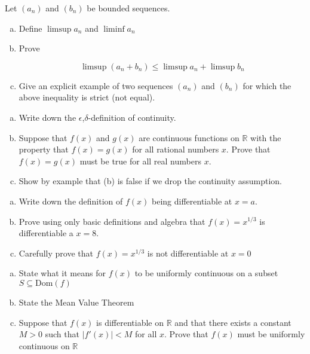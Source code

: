 \documentclass[11pt]{exam}
\theoremstyle{definition}
\begin{document}
\begin{questions}
\newpage
\question[10]\mbox{}
Let $(a_n)$ and $(b_n)$ be bounded sequences.
\begin{enumerate}[(a)]
\item Define $\limsup a_n$ and $\liminf a_n$
\vspace{2in}
\item Prove

$$\limsup (a_n+b_n)\leq \limsup a_n + \limsup b_n$$
\vspace{3in}

\item

Give an explicit example of two sequences $(a_n)$ and $(b_n)$ for which the above inequality is strict (not equal).
\end{enumerate}


\newpage
\question[10]\mbox{}

\begin{enumerate}[(a)]
\item Write down the $\epsilon$,$\delta$-definition of continuity.
\vspace{2in}
\item Suppose that $f(x)$ and $g(x)$ are continuous functions on $\mathbb{R}$ with the property that $f(x) = g(x)$ for all rational numbers $x$.  Prove that $f(x)=g(x)$ must be true for all real numbers $x$.
\vspace{3in}
\item Show by example that (b) is false if we drop the continuity assumption.
\end{enumerate}


\newpage
\question[10]\mbox{}

\begin{enumerate}[(a)]
\item Write down the definition of $f(x)$ being differentiable at $x=a$.
\vspace{1.3in}
\item Prove using only basic definitions and algebra that $f(x) = x^{1/3}$ is differentiable a $x=8$.
\vspace{4in}
\item Carefully prove that $f(x) = x^{1/3}$ is not differentiable at $x=0$
\end{enumerate}

\newpage
\question[10]\mbox{}

\begin{enumerate}[(a)]
\item State what it means for $f(x)$ to be uniformly continuous on a subset $S\subseteq\text{Dom}(f)$
\vspace{1.3in}
\item State the Mean Value Theorem
\vspace{1.3in}
\item Suppose that $f(x)$ is differentiable on $\mathbb R$ and that there exists a constant $M>0$ such that $\lvert f'(x)\rvert < M$ for all $x$.  Prove that $f(x)$ must be uniformly continuous on $\mathbb{R}$
\end{enumerate}



\end{questions}
\end{document}
